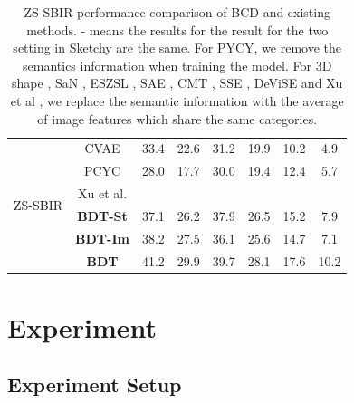 \documentclass[10pt,twocolumn,letterpaper]{article}
\begin{document}
\begin{table}[!htb]
{\begin{tabular}{cccccccc}
\multirow{6}{*}{ZS-SBIR} & CVAE \cite{yelamarthi2018zero}                   & 33.4                  & 22.6               & 31.2                   & 19.9                & 10.2              & 4.9            \\
                         & PCYC \cite{dupont2018learning}                   & 28.0                  & 17.7               & 30.0                   & 19.4                & 12.4              & 5.7            \\
                         & Xu et al. \cite{xu2019semantic}              &                       &                    &                        &                     &                   &                \\
                         & \textbf{BDT-St}            & 37.1                  & 26.2               & 37.9                   & 26.5                & 15.2              & 7.9           \\
                         & \textbf{BDT-Im}            & 38.2                  & 27.5               & 36.1                   & 25.6                & 14.7              & 7.1           \\
                         & \textbf{BDT}            & 41.2                  & 29.9               & 39.7                   & 28.1                & 17.6              & 10.2           \\ \hline \hline
\end{tabular}%
}
\caption{ZS-SBIR performance comparison of BCD and existing methods. - means the results for the result for the two setting in Sketchy are the same. For PYCY\cite{dupont2018learning}, we remove the semantics information when training the model. For 3D shape \cite{wang2015sketch}, SaN \cite{yu2017sketch}, ESZSL \cite{romera2015embarrassingly}, SAE \cite{kodirov2017semantic}, CMT \cite{socher2013zero}, SSE \cite{zhang2015bit}, DeViSE \cite{frome2013devise} and Xu et al \cite{xu2019semantic}, we replace the semantic information with the average of image features which share the same categories\protect\footnotemark[1].}
\label{tab:1}
\end{table}



\section{Experiment}

\subsection{Experiment Setup}
\end{document}
